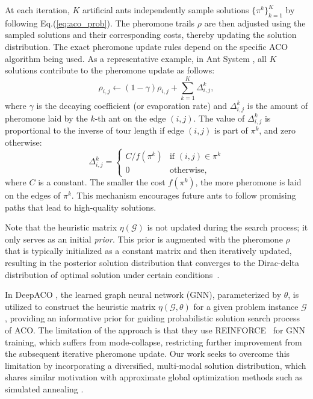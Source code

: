 \documentclass[twoside]{article}
\theoremstyle{plain}
\theoremstyle{definition}
\theoremstyle{remark}
\begin{document}
At each iteration, $K$ artificial ants independently sample solutions $\{\pi^k\}_{k=1}^K$ by following Eq.(\ref{eq:aco_prob}). The pheromone trails $\rho$ are then adjusted using the sampled solutions and their corresponding costs, thereby updating the solution distribution. The exact pheromone update rules depend on the specific ACO algorithm being used.
As a representative example, in Ant System \citep{ant-sys}, all $K$ solutions contribute to the pheromone update as follows:
\begin{equation} \label{eq:ant_system}
    \rho_{i,j} \leftarrow (1 - \gamma)\rho_{i,j} + \sum\limits_{k=1}^{K} \Delta^k_{i,j},
\end{equation}
where $\gamma$ is the decaying coefficient (or evaporation rate) and $\Delta^k_{i,j}$ is the amount of pheromone laid by the $k$-th ant on the edge $(i, j)$. The value of $\Delta^k_{i,j}$ is proportional to the inverse of tour length if edge $(i, j)$ is part of $\pi^k$, and zero otherwise:
\begin{equation} \label{eq:as_pheromone}
       \Delta^k_{i,j} = \begin{cases} C / f(\pi^k) & \text{if $(i, j) \in \pi^k$} \\ 0 & \text{otherwise}, \end{cases}
\end{equation}
where $C$ is a constant. The smaller the cost $f(\pi^k)$, the more pheromone is laid on the edges of $\pi^k$. This mechanism encourages future ants to follow promising paths that lead to high-quality solutions.

Note that the heuristic matrix $\eta(\mathcal{G})$ is not updated during the search process; it only serves as an initial \textit{prior}. This prior is augmented with the pheromone $\rho$ that is typically initialized as a constant matrix and then iteratively updated, resulting in the posterior solution distribution that converges to the Dirac-delta distribution of optimal solution under certain conditions~\citep{dorigo1997ant, dorigo2005ant}.

In DeepACO \citep{ye2023deepaco}, the learned graph neural network (GNN), parameterized by $\theta$, is utilized to construct the heuristic matrix $\eta(\mathcal{G},\theta)$ for a given problem instance $\mathcal{G}$, providing an informative prior for guiding probabilistic solution search process of ACO. The limitation of the approach is that they use REINFORCE~\citep{williams1992simple} for GNN training, which suffers from mode-collapse, restricting further improvement from the subsequent iterative pheromone update. Our work seeks to overcome this limitation by incorporating a diversified, multi-modal solution distribution, which shares similar motivation with approximate global optimization methods such as simulated annealing \citep{kirkpatrick1983optimization}.
\end{document}
